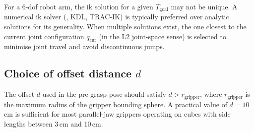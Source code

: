 \documentclass{article}
\begin{document}
For a 6-\ac{dof} robot arm, the \ac{ik} solution for a given $T_{\text{goal}}$ may not be
unique.
A numerical \ac{ik} solver (\eg, KDL, TRAC-IK) is typically preferred over analytic
solutions for its generality.
When multiple solutions exist, the one closest to the current joint configuration $q_{\text{cur}}$
(in the L2 joint-space sense) is selected to minimise joint travel and avoid discontinuous
jumps.

\subsection{Choice of offset distance $d$}

The offset $d$ used in the pre-grasp pose should satisfy $d > r_{\text{gripper}}$, where
$r_{\text{gripper}}$ is the maximum radius of the gripper bounding sphere.
A practical value of $d = 10$\,cm is sufficient for most parallel-jaw grippers operating
on cubes with side lengths between 3\,cm and 10\,cm.
\end{document}
